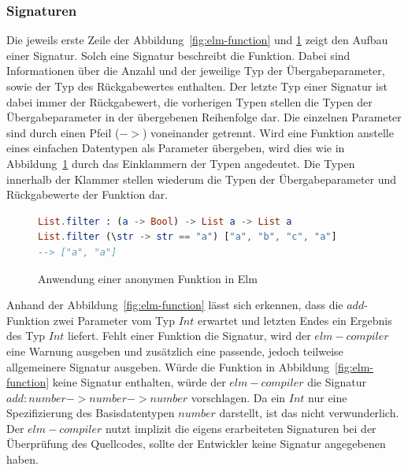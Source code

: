 \subsubsection{Signaturen}
\label{sec:Signaturen}
Die jeweils erste Zeile der Abbildung~\ref{fig:elm-function} und \ref{fig:elm-anonym-function} zeigt den Aufbau einer Signatur. Solch eine Signatur beschreibt die Funktion. Dabei sind Informationen über die Anzahl und der jeweilige Typ der Übergabeparameter, sowie der Typ des Rückgabewertes enthalten. Der letzte Typ einer Signatur ist dabei immer der Rückgabewert, die vorherigen Typen stellen die Typen der Übergabeparameter in der übergebenen Reihenfolge dar. Die einzelnen Parameter sind durch einen Pfeil ($->$) voneinander getrennt. Wird eine Funktion anstelle eines einfachen Datentypen als Parameter übergeben, wird dies wie in Abbildung~\ref{fig:elm-anonym-function} durch das Einklammern der Typen angedeutet. Die Typen innerhalb der Klammer stellen wiederum die Typen der Übergabeparameter und Rückgabewerte der Funktion dar.
\begin{figure}[h]
\begin{lstlisting}[language=Elm]
List.filter : (a -> Bool) -> List a -> List a
List.filter (\str -> str == "a") ["a", "b", "c", "a"]
--> ["a", "a"]
\end{lstlisting}
\caption{Anwendung einer anonymen Funktion in Elm}\label{fig:elm-anonym-function}
\end{figure}
Anhand der Abbildung~\ref{fig:elm-function} lässt sich erkennen, dass die $add$-Funktion zwei Parameter vom Typ $Int$ erwartet und letzten Endes ein Ergebnis des Typ $Int$ liefert. Fehlt einer Funktion die Signatur, wird der $elm-compiler$ eine Warnung ausgeben und zusätzlich eine passende, jedoch teilweise allgemeinere Signatur ausgeben. Würde die Funktion in Abbildung~\ref{fig:elm-function} keine Signatur enthalten, würde der $elm-compiler$ die Signatur $add : number -> number -> number$ vorschlagen. Da ein $Int$ nur eine Spezifizierung des Basisdatentypen $number$ darstellt, ist das nicht verwunderlich. Der $elm-compiler$ nutzt implizit die eigens erarbeiteten Signaturen bei der Überprüfung des Quellcodes, sollte der Entwickler keine Signatur angegebenen haben.

